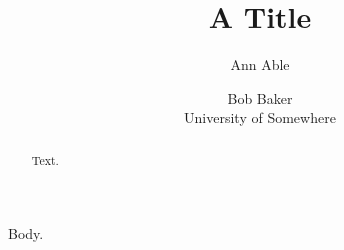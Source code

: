 \documentclass{llncs}
\begin{document}
\title{A Title}
\author{Ann Able \and Bob Baker\\ University of Somewhere\\ }
\maketitle
\begin{abstract}Text.\end{abstract}
Body.
\end{document}
